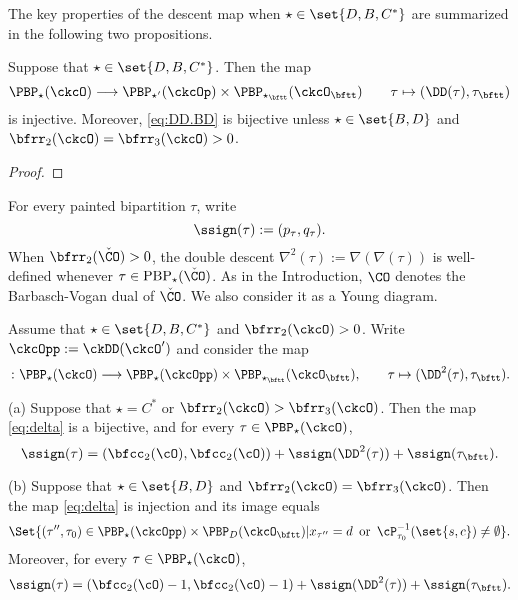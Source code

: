 \documentclass[ssunip]{subfiles}
\begin{document}
\medskip

The key properties of the descent map when $\star\in \set{D,B,C^*}$ are summarized in the following two propositions.   

\begin{prop}\label{prop:DD.BD}
Suppose that $\star \in \set{D,B,C^*}$.
Then the map 
\begin{equation}\label{eq:DD.BD}
   \PBP_\star(\ckcO)\longrightarrow
   \PBP_{\star'}(\ckcOp)\times \PBP_{\star_\bftt}(\ckcO_\bftt)
   \qquad \tau \mapsto (\DD(\tau), \tau_\bftt)
\end{equation}
is injective. Moreover, \eqref{eq:DD.BD} is bijective 
unless $\star\in \set{B,D}$ and $\bfrr_2(\ckcO)=\bfrr_3(\ckcO)>0$. 
\end{prop}
\begin{proof}
 
\end{proof}







For every painted bipartition $\tau$, write
\[
  \ssign(\tau):=(p_\tau, q_\tau).
\]
When $\bfrr_2(\check \CO)>0$, the double descent $\nabla^2(\tau):=\nabla(\nabla(\tau))$ is well-defined whenever $\tau\in \mathrm{PBP}_\star(\check \CO)$. 
As in the Introduction, $\CO$ denotes the Barbasch-Vogan dual of $\check \CO$. We also consider it as a Young diagram. 

\begin{prop}\label{prop:delta}
Assume that $\star \in \set{D,B,C^*}$ and $\bfrr_2(\ckcO)>0$. Write $\ckcOpp := \ckDD(\ckcO')$ and consider the map 
\begin{equation}\label{eq:delta}
    \colon \PBP_\star(\ckcO)\longrightarrow 
    \PBP_\star(\ckcOpp)\times \PBP_{\star_\bftt}(\ckcO_\bftt),
    \qquad \tau \mapsto (\DD^2(\tau),\tau_\bftt).
\end{equation}

\noindent (a) Suppose that 
$\star = C^*$ or $\bfrr_2(\ckcO)>\bfrr_3(\ckcO)$. Then the map \eqref{eq:delta} is a bijective, and for every $\tau\in  \PBP_\star(\ckcO) $, 
\[
\ssign(\tau)
=(\bfcc_2(\cO),\bfcc_2(\cO))+\ssign(\DD^2(\tau))+\ssign(\tau_\bftt).
\]

\noindent (b) Suppose that  $\star \in \set{B,D}$ and $\bfrr_2(\ckcO)=\bfrr_3(\ckcO)$. Then the map \eqref{eq:delta} is  injection and its  image equals 
    \[
    \Set{ (\tau'',\tau_0)  \in \PBP_\star(\ckcOpp)\times \PBP_D(\ckcO_\bftt)  | 
    x_{\tau''} = d\, \text{ or } \,
    \cP_{\tau_0}^{-1}(\set{s,c})\neq \emptyset }.
    \]
    Moreover,  for every $\tau\in  \PBP_\star(\ckcO) $, 
\[
\ssign(\tau)
=(\bfcc_2(\cO)-1,\bfcc_2(\cO)-1)+\ssign(\DD^2(\tau))+\ssign(\tau_\bftt).
\]
\end{prop}
\end{document}
